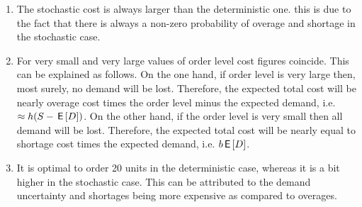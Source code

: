 \begin{exercise}[Continuation]
\begin{solution}
\begin{enumerate}
\item The stochastic cost is always larger than the deterministic one. this is due to the fact that there is always a non-zero probability of overage and shortage in the stochastic case. 
\item For very small and very large values of order level cost figures coincide. This can be explained as follows. On the one hand, if order level is very large then, most surely, no demand will be lost. Therefore, the expected total cost will be nearly overage cost times the order level minus the expected demand, i.e. $\approx h(S-\,\mathsf{E}\left[D\right])$. On the other hand, if the order level is very small then all demand will be lost. Therefore, the expected total cost will be nearly equal to shortage cost times the expected demand, i.e. $b \,\mathsf{E}\left[D\right]$. 
\item It is optimal to order 20 units in the deterministic case, whereas it is a bit higher in the stochastic case. This can be attributed to the demand uncertainty and shortages being more expensive as compared to overages. 
\end{enumerate}

\end{solution}
\end{exercise}




